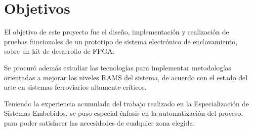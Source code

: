 %		
	\section{Objetivos}
	
		El objetivo de este proyecto fue el diseño, implementación y realización de pruebas funcionales de un prototipo de sistema electrónico de enclavamiento, sobre un kit de desarrollo de FPGA. 
		
		Se procuró además estudiar las tecnologías para implementar metodologías orientadas a mejorar los niveles RAMS del sistema, de acuerdo con el estado del arte en sistemas ferroviarios altamente críticos. 
		
		Teniendo la experiencia acumulada del trabajo realizado en la Especialización de Sistemas Embebidos, se puso especial énfasis en la automatización del proceso, para poder satisfacer las necesidades de cualquier zona elegida. 

